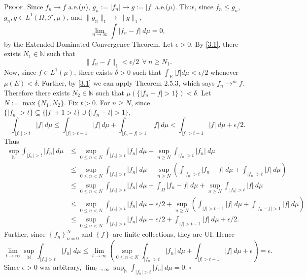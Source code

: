 \documentclass[12pt]{article}
\newcounter{ProofCounter}
\newenvironment{Proof}{\stepcounter{ProofCounter}\textsc{Proof.}}{\hfill$\square$}
\begin{document}
\begin{Proof}
Since $f_{n} \rightarrow f$ a.e.($\mu$), $g_{n} := |f_{n}| \rightarrow g := |f|$ a.e.($\mu$). Thus, since $f_{n} \leq g_n$, $g_{n}, g \in
L^{1}(\Omega, \mathcal{F}, \mu)$, and $\|g_{n}\|_{1} \rightarrow \|g\|_{1}$,
\begin{equation}
\lim_{n\rightarrow\infty}\int |f_{n} - f|\ d\mu = 0,
\label{3.1}
\end{equation}
by the Extended Dominated Convergence Theorem. Let $\epsilon > 0$. By \eqref{3.1}, there exists $N_{1} \in \mathbb{N}$ such that 
\begin{equation}
\|f_{n} - f\|_{1} < \epsilon/2 \ \ \forall \ n \geq N_{1}. 
\label{3.2}
\end{equation}
Now, since $f \in L^{1}(\mu)$, there exists $\delta > 0$ such that $\int_{E}|f|d\mu < \epsilon / 2$ whenever $\mu(E) < \delta$.
Further, by \eqref{3.1} we can apply Theorem 2.5.3, which says $f_{n} \rightarrow^{m} f$. Therefore there exists $N_{2} \in \mathbb{N}$ such that 
$\mu\left( \{|f_{n} - f| > 1\} \right) < \delta$. Let $N := \max\{N_{1}, N_{2}\}$.
Fix $t > 0$. For $n \geq N$, since
$\{|f_{n}| > t\} \subseteq \{|f| + 1 > t\} \cup \{ |f_{n} - t| > 1\}$,
\begin{equation}
\int_{|f_{n}| > t}|f|\ d\mu \leq \int_{|f| > t - 1}|f| \ d\mu + \int_{|f_{n}-f|>1}|f|\ d\mu < \int_{|f| > t -1}|f|\ d\mu + \epsilon/2.
\label{3.3}
\end{equation}
Thus
\begin{align*}
\sup_{\mathbb{N}} \int_{|f_{n}| > t}|f_{n}|\ d\mu & \leq \sup_{0\leq n < N}\int_{|f_{n}| > t}|f_{n}|\ d\mu + \sup_{n\geq N}\int_{|f_{n}| > t}|f_{n}|\
d\mu \\
& \leq \sup_{0\leq n < N}\int_{|f_{n}| > t}|f_{n}|\ d\mu + \sup_{n\geq N}\left(\int_{|f_{n}| > t}|f_{n} - f|\ d\mu + \int_{|f_{n}|>t}|f|\ d\mu\right) \\
& \leq \sup_{0\leq n < N}\int_{|f_{n}| > t}|f_{n}|\ d\mu + \int_{\Omega}|f_{n} - f|\ d\mu + \sup_{n\geq N}\int_{|f_{n}|>t}|f|\ d\mu \\
& \leq \sup_{0\leq n < N}\int_{|f_{n}| > t}|f_{n}|\ d\mu + \epsilon/2 + \sup_{n\geq N}\left(\int_{|f|>t-1}|f|\ d\mu + \int_{|f_{n}-f|>1}|f|\
d\mu\right) \\
& \leq \sup_{0\leq n < N}\int_{|f_{n}| > t}|f_{n}|\ d\mu + \epsilon/2 + \int_{|f|>t-1}|f|\ d\mu + \epsilon / 2.
\end{align*}
Further, since $\left\{ f_{n} \right\}_{n=0}^{N}$ and $\left\{ f \right\}$ are finite collections, they are UI. Hence 
\[ \lim_{t\rightarrow\infty}\sup_{\mathbb{N}}\int_{|f_{n}| > t}|f_{n}|\ d\mu \leq \lim_{t\rightarrow\infty}\left( \sup_{0\leq n < N}\int_{|f_{n}| > t}
|f_{n}|\ d\mu + \int_{|f| > t -1}|f|\ d\mu + \epsilon \right) = \epsilon. \]
Since $\epsilon > 0$ was arbitrary, $\lim_{t\rightarrow\infty}\sup_{\mathbb{N}}\int_{|f_{n}| > t}|f_{n}|\ d\mu = 0$.
\end{Proof}
\end{document}
